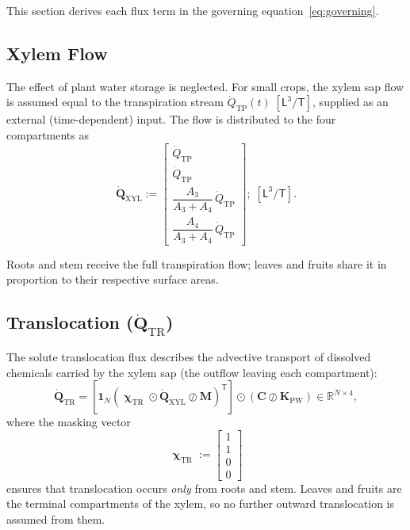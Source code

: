\documentclass[12pt,a4paper]{article}
\newcommand{\R}{\mathbb{R}}
\newcommand{\oN}{\mathbf{1}_N}
\newcommand{\dL}{\mathsf{L}}
\newcommand{\dT}{\mathsf{T}}
\begin{document}
This section derives each flux term in the governing equation~\eqref{eq:governing}.

\subsection{Xylem Flow}\label{sec:xylem}

The effect of plant water storage is neglected.  For small crops, the xylem sap flow is assumed equal to the transpiration stream $\dot{Q}_\mathrm{TP}(t)\;[\dL^3/\dT]$, supplied as an external (time-dependent) input.  The flow is distributed to the four compartments as
\begin{equation}\label{eq:xylem}
    \dot{\mathbf{Q}}_\mathrm{XYL} :=
    \begin{bmatrix}
        \dot{Q}_\mathrm{TP}\\[4pt]
        \dot{Q}_\mathrm{TP}\\[4pt]
        \dfrac{A_3}{A_3 + A_4}\,\dot{Q}_\mathrm{TP}\\[6pt]
        \dfrac{A_4}{A_3 + A_4}\,\dot{Q}_\mathrm{TP}
    \end{bmatrix};\; [\dL^3/\dT].
\end{equation}

Roots and stem receive the full transpiration flow; leaves and fruits share it in proportion to their respective surface areas.


\subsection{Translocation (\texorpdfstring{$\dot{\mathbf{Q}}_\mathrm{TR}$}{Q\_TR})}\label{sec:translocation}

The solute translocation flux describes the advective transport of dissolved chemicals carried by the xylem sap (the outflow leaving each compartment):
\begin{equation}\label{eq:Qtr}
    \dot{\mathbf{Q}}_\mathrm{TR} = \left[\oN\!\left(\bm{\upchi}_\mathrm{TR}\odot\dot{\mathbf{Q}}_\mathrm{XYL} \oslash \mathbf{M}\right)^\mathsf{T}\right] \odot \left(\mathbf{C} \oslash \mathbf{K}_\mathrm{PW}\right)\in \R^{N\times4},
\end{equation}
where the masking vector
\begin{equation*}
    \bm{\upchi}_\mathrm{TR} := 
    \begin{bmatrix}
        1 \\ 1 \\ 0 \\ 0
    \end{bmatrix}
\end{equation*}
ensures that translocation occurs \emph{only} from roots and stem.  Leaves and fruits are the terminal compartments of the xylem, so no further outward translocation is assumed from them.
\end{document}
